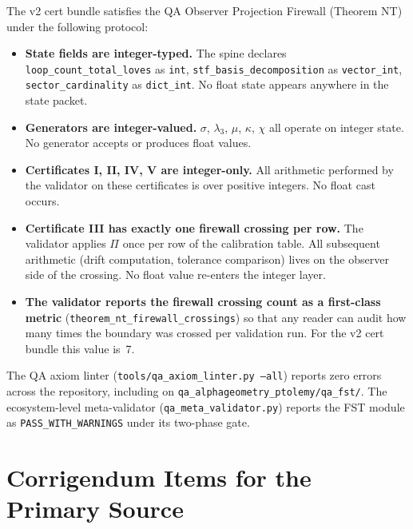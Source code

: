 \documentclass[12pt,a4paper]{article}
\begin{document}
The v2 cert bundle satisfies the QA Observer Projection Firewall
(Theorem NT) under the following protocol:
\begin{itemize}[nosep]
  \item \textbf{State fields are integer-typed.} The spine declares
        \texttt{loop\_count\_total\_loves} as \texttt{int},
        \texttt{stf\_basis\_decomposition} as \texttt{vector\_int},
        \texttt{sector\_cardinality} as \texttt{dict\_int}. No float
        state appears anywhere in the state packet.
  \item \textbf{Generators are integer-valued.} $\sigma$, $\lambda_3$,
        $\mu$, $\kappa$, $\chi$ all operate on integer state. No
        generator accepts or produces float values.
  \item \textbf{Certificates I, II, IV, V are integer-only.} All
        arithmetic performed by the validator on these certificates
        is over positive integers. No float cast occurs.
  \item \textbf{Certificate III has exactly one firewall crossing per
        row.} The validator applies $\Pi$ once per row of the
        calibration table. All subsequent arithmetic (drift
        computation, tolerance comparison) lives on the observer side
        of the crossing. No float value re-enters the integer layer.
  \item \textbf{The validator reports the firewall crossing count as a
        first-class metric}
        (\texttt{theorem\_nt\_firewall\_crossings}) so that any
        reader can audit how many times the boundary was crossed per
        validation run. For the v2 cert bundle this value is~7.
\end{itemize}
The QA axiom linter (\texttt{tools/qa\_axiom\_linter.py --all}) reports
zero errors across the repository, including on
\texttt{qa\_alphageometry\_ptolemy/qa\_fst/}. The ecosystem-level
meta-validator (\texttt{qa\_meta\_validator.py}) reports the FST
module as \texttt{PASS\_WITH\_WARNINGS} under its two-phase gate.


\section{Corrigendum Items for the Primary Source}
\label{sec:corrigendum}
\end{document}
